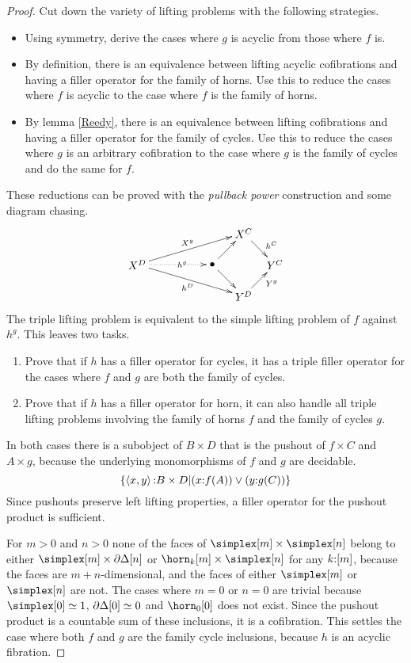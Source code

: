 \documentclass[csh.tex]{subfiles}
\begin{document}
\begin{proof} 
Cut down the variety of lifting problems with the following strategies.
\begin{itemize}
\item Using symmetry, derive the cases where $g$ is acyclic from those where $f$ is.
\item By definition, there is an equivalence between lifting acyclic cofibrations and having a filler operator for the family of horns. Use this to reduce the cases where $f$ is acyclic to the case where $f$ is the family of horns.
\item By lemma \ref{Reedy}, there is an equivalence between lifting cofibrations and having a filler operator for the family of cycles. Use this to reduce the cases where $g$ is an arbitrary cofibration to the case where $g$ is the family of cycles and do the same for $f$.
\end{itemize}
These reductions can be proved with the \emph{pullback power} construction and some diagram chasing.
\[\xy
(34,20)*+{X^C}="top",(0,10)*+{X^D}="left",(24,10)*+{\bullet}="middle",(44,10)*+{Y^C}="right",(34,0)*+{Y^D}="bottom"
\ar^{X^g} "left";"top" \ar@{.>}|(.6){h^g} "left";"middle" \ar_{h^D} "left";"bottom" \ar "middle";"bottom"
\ar "middle";"top" \ar^(.6){h^C} "top";"right" \ar_(.6){Y^g} "bottom";"right"
\endxy\]
The triple lifting problem is equivalent to the simple lifting problem of $f$ against $h^g$.
This leaves two tasks.
\begin{enumerate}
\item Prove that if $h$ has a filler operator for cycles, it has a triple filler operator for the cases where $f$ and $g$ are both the family of cycles.
\item Prove that if $h$ has a filler operator for horn, it can also handle all triple lifting problems involving the family of horns $f$ and the family of cycles $g$.
\end{enumerate}

In both cases there is a subobject of $B\times D$ that is the pushout of $f\times C$ and $A\times g$, because the underlying monomorphisms of $f$ and $g$ are decidable.
\[ \left\{\left\langle x,y \right\rangle\mathord : B\times D\middle| (x\mathord : f(A)) \vee (y\mathord : g(C)) \right\}\]
Since pushouts preserve left lifting properties, a filler operator for the pushout product is sufficient.

For $m > 0$ and $n > 0$ none of the faces of $\simplex[m]\times \simplex[n]$ belong to either $\simplex[m]\times \cycle[n]$ or $\horn_k[m]\times\simplex[n]$ for any $k\mathord :[m]$, because the faces are $m+n$-dimensional, and the faces of either $\simplex[m]$ or $\simplex[n]$ are not. The cases where $m=0$ or $n=0$ are trivial because $\simplex[0] \simeq 1$, $\partial\Delta[0]\simeq 0$ and $\horn_0[0]$ does not exist. Since the pushout product is a countable sum of these inclusions, it is a cofibration. This settles the case where both $f$ and $g$ are the family cycle inclusions, because $h$ is an acyclic fibration.


\end{proof}
\end{document}
